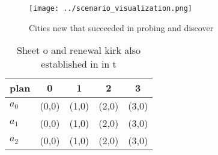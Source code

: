 \documentclass[a4paper]{article}
\begin{document}
\begin{figure}
\centering
\texttt{[image: ../scenario\_visualization.png]}
\caption{Cities new that succeeded in probing and discover
}
\end{figure}
 
\begin{table}
\begin{adjustbox}{width=0.6\columnwidth}
\begin{tabular}{|l|l|l|l|l|}
\hline
\textbf{plan} & \multicolumn{1}{c|}{\textbf{0}} & \multicolumn{1}{c|}{\textbf{1}} & \multicolumn{1}{c|}{\textbf{2}} & \multicolumn{1}{c|}{\textbf{3}} \\ \hline
\textbf{$a_0$}  & (0,0) & (1,0) & (2,0) & (3,0) \\ \hline
\textbf{$a_1$}  & (0,0) & (1,0) & (2,0) & (3,0) \\ \hline
\textbf{$a_2$}  & (0,0) & (1,0) & (2,0) & (3,0) \\ \hline
\end{tabular}
\end{adjustbox}
\caption{Sheet o and renewal kirk also established in in t
}
\end{table}
\end{document}
